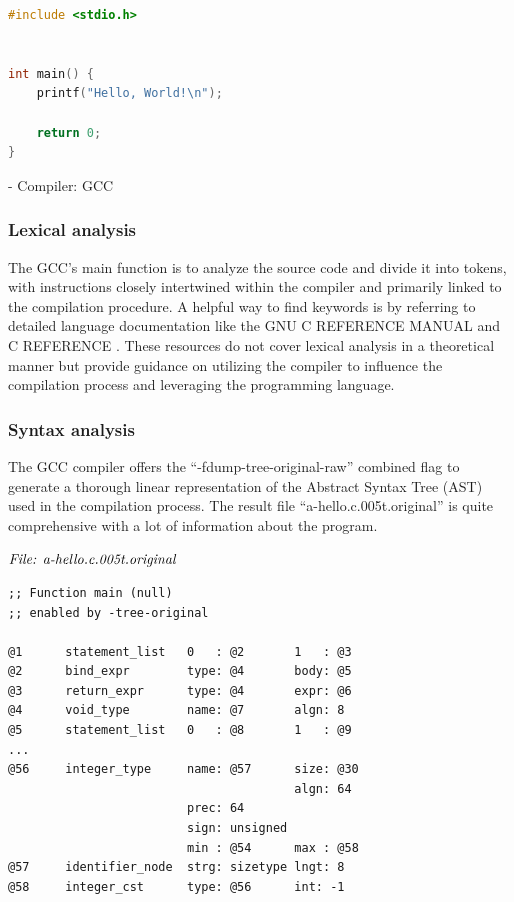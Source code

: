 \documentclass[journal]{IEEEtran}
\begin{document}
\begin{lstlisting}[language=C, breaklines=true, basicstyle=\footnotesize, frame=single]
#include <stdio.h>


int main() {
	printf("Hello, World!\n");

	return 0;
}
\end{lstlisting}
   
   - Compiler: GCC
\subsubsection{Lexical analysis}
The GCC's main function is to analyze the source code and divide it into tokens, with instructions closely intertwined within the compiler and primarily linked to the compilation procedure. A helpful way to find keywords is by referring to detailed language documentation like the GNU C REFERENCE MANUAL \cite{30} and C REFERENCE \cite{31}. These resources do not cover lexical analysis in a theoretical manner but provide guidance on utilizing the compiler to influence the compilation process and leveraging the programming language.
\subsubsection{Syntax analysis}
The GCC compiler offers the ``-fdump-tree-original-raw'' combined flag to generate a thorough linear representation of the Abstract Syntax Tree (AST) used in the compilation process. The result file ``a-hello.c.005t.original'' is quite comprehensive with a lot of information about the program. 

$\\\textit{File: a-hello.c.005t.original}$

\begin{lstlisting}[breaklines=true, basicstyle=\footnotesize, frame=single]
;; Function main (null)
;; enabled by -tree-original

@1      statement_list   0   : @2       1   : @3      
@2      bind_expr        type: @4       body: @5      
@3      return_expr      type: @4       expr: @6      
@4      void_type        name: @7       algn: 8       
@5      statement_list   0   : @8       1   : @9
...
@56     integer_type     name: @57      size: @30      
                                        algn: 64      
                         prec: 64       
                         sign: unsigned 
                         min : @54      max : @58     
@57     identifier_node  strg: sizetype lngt: 8       
@58     integer_cst      type: @56      int: -1
\end{lstlisting}
\end{document}

